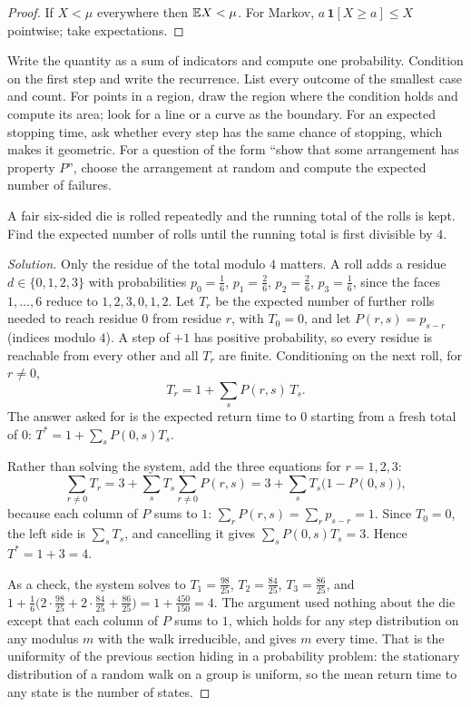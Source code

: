 \begin{proof}
If $X<\mu$ everywhere then $\mathbb{E} X<\mu$. For Markov, $a\,\mathbf 1[X\ge a]\le X$ pointwise; take expectations.
\end{proof}

\begin{firstmoves}
Write the quantity as a sum of indicators and compute one probability. Condition on the first step and write the recurrence. List every outcome of the smallest case and count. For points in a region, draw the region where the condition holds and compute its area; look for a line or a curve as the boundary. For an expected stopping time, ask whether every step has the same chance of stopping, which makes it geometric. For a question of the form ``show that some arrangement has property $P$'', choose the arrangement at random and compute the expected number of failures.
\end{firstmoves}

\begin{example}
A fair six-sided die is rolled repeatedly and the running total of the rolls is kept. Find the expected number of rolls until the running total is first divisible by $4$.
\end{example}

\begin{proof}[Solution]
Only the residue of the total modulo $4$ matters. A roll adds a residue $d\in\{0,1,2,3\}$ with probabilities $p_0=\tfrac16$, $p_1=\tfrac26$, $p_2=\tfrac26$, $p_3=\tfrac16$, since the faces $1,\dots,6$ reduce to $1,2,3,0,1,2$. Let $T_r$ be the expected number of further rolls needed to reach residue $0$ from residue $r$, with $T_0=0$, and let $P(r,s)=p_{s-r}$ (indices modulo $4$). A step of $+1$ has positive probability, so every residue is reachable from every other and all $T_r$ are finite. Conditioning on the next roll, for $r\ne 0$,
\[
T_r=1+\sum_{s}P(r,s)\,T_s .
\]
The answer asked for is the expected return time to $0$ starting from a fresh total of $0$: $T^{*}=1+\sum_s P(0,s)T_s$.

Rather than solving the system, add the three equations for $r=1,2,3$:
\[
\sum_{r\ne 0}T_r=3+\sum_s T_s\sum_{r\ne 0}P(r,s)=3+\sum_s T_s\bigl(1-P(0,s)\bigr),
\]
because each column of $P$ sums to $1$: $\sum_rP(r,s)=\sum_r p_{s-r}=1$. Since $T_0=0$, the left side is $\sum_sT_s$, and cancelling it gives $\sum_sP(0,s)T_s=3$. Hence $T^{*}=1+3=4$.

As a check, the system solves to $T_1=\tfrac{98}{25}$, $T_2=\tfrac{84}{25}$, $T_3=\tfrac{86}{25}$, and $1+\tfrac16\bigl(2\cdot\tfrac{98}{25}+2\cdot\tfrac{84}{25}+\tfrac{86}{25}\bigr)=1+\tfrac{450}{150}=4$. The argument used nothing about the die except that each column of $P$ sums to $1$, which holds for any step distribution on any modulus $m$ with the walk irreducible, and gives $m$ every time. That is the uniformity of the previous section hiding in a probability problem: the stationary distribution of a random walk on a group is uniform, so the mean return time to any state is the number of states.
\end{proof}

